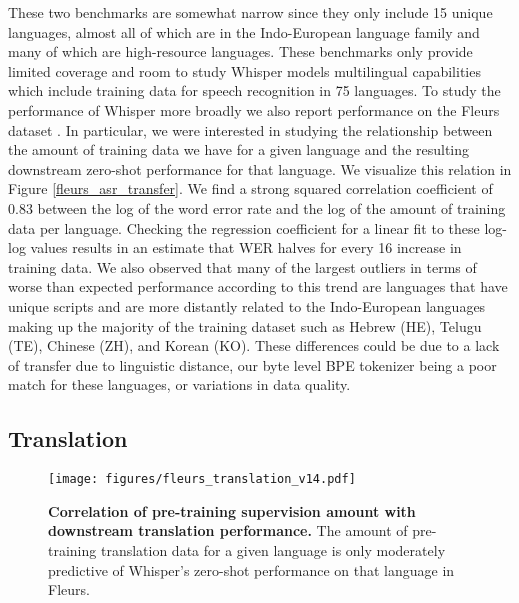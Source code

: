 \documentclass[nohyperref]{article}
\theoremstyle{plain}
\theoremstyle{definition}
\theoremstyle{remark}
\begin{document}
These two benchmarks are somewhat narrow since they only include 15 unique languages, almost all of which are in the Indo-European language family and many of which are high-resource languages. These benchmarks only provide limited coverage and room to study Whisper models multilingual capabilities which include training data for speech recognition in 75 languages. To study the performance of Whisper more broadly we also report performance on the Fleurs dataset \cite{conneau2022fleurs}. In particular, we were interested in studying the relationship between the amount of training data we have for a given language and the resulting downstream zero-shot performance for that language. We visualize this relation in Figure \ref{fleurs_asr_transfer}. We find a strong squared correlation coefficient of 0.83 between the log of the word error rate and the log of the amount of training data per language. Checking the regression coefficient for a linear fit to these log-log values results in an estimate that WER halves for every 16 increase in training data. We also observed that many of the largest outliers in terms of worse than expected performance according to this trend are languages that have unique scripts and are more distantly related to the Indo-European languages making up the majority of the training dataset such as Hebrew ({\footnotesize\textsf{HE}}), Telugu ({\footnotesize\textsf{TE}}), Chinese ({\footnotesize\textsf{ZH}}), and Korean ({\footnotesize\textsf{KO}}). These differences could be due to a lack of transfer due to linguistic distance, our byte level BPE tokenizer being a poor match for these languages, or variations in data quality.

\subsection{Translation}\label{subsec:cross-lingual}

\begin{figure}[t]
\begin{center}
\centerline{\texttt{[image: figures/fleurs\_translation\_v14.pdf]}}
\caption{\textbf{Correlation of pre-training supervision amount with downstream translation performance.} The amount of pre-training translation data for a given language is only moderately predictive of Whisper's zero-shot performance on that language in Fleurs.}
\label{translation_transfer}
\end{center}
\vspace{-1em}
\end{figure}
\end{document}
